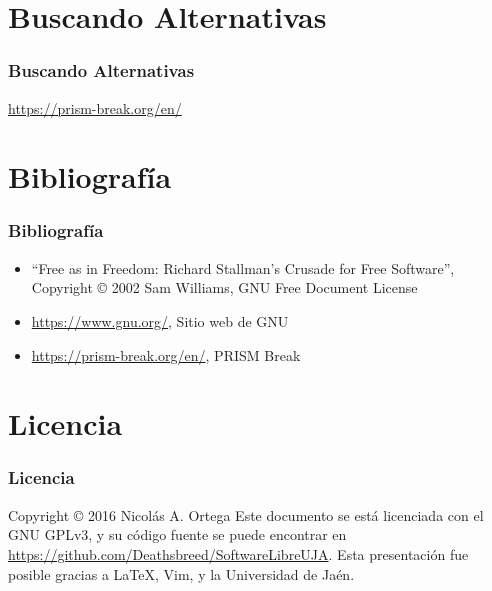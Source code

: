 \documentclass[xetex, mathserif, serif]{beamer}
\begin{document}

\section{Buscando Alternativas}
\begin{frame}
    \frametitle{Buscando Alternativas}
    \centering \Large \url{https://prism-break.org/en/}
\end{frame}


\section{Bibliografía}
\begin{frame}[t]
    \frametitle{Bibliografía}
    \begin{itemize}
        \item ``Free as in Freedom: Richard Stallman's Crusade for Free Software'', Copyright \copyright{} 2002 Sam Williams, GNU Free Document License
        \item \url{https://www.gnu.org/}, Sitio web de GNU
        \item \url{https://prism-break.org/en/}, PRISM Break
    \end{itemize}
\end{frame}


\section{Licencia}
\begin{frame}
    \frametitle{Licencia}
    Copyright \copyright{} 2016 Nicolás A. Ortega
    \linebreak{}
    \linebreak{}
    Este documento se está licenciada con el GNU GPLv3, y su código fuente se puede encontrar en \url{https://github.com/Deathsbreed/SoftwareLibreUJA}.
    \linebreak{}
    \linebreak{}
    Esta presentación fue posible gracias a \LaTeX, Vim, y la Universidad de Jaén.
\end{frame}
\end{document}
